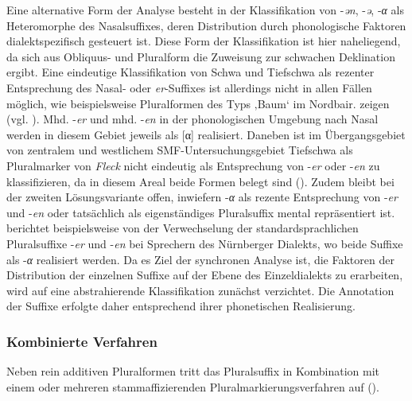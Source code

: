 Eine alternative Form der Analyse besteht in der Klassifikation von -\textit{ən}, -\textit{ə}, \mbox{-\textit{α}} als Heteromorphe des Nasalsuffixes, deren Distribution durch phonologische Faktoren dialektspezifisch gesteuert ist. Diese Form der Klassifikation ist hier naheliegend, da sich aus Obliquus- und Pluralform die Zuweisung zur schwachen Deklination ergibt. Eine eindeutige Klassifikation von Schwa und Tiefschwa als rezenter Entsprechung des Nasal- oder \textit{er}{}-Suffixes ist allerdings nicht in allen Fällen möglich, wie beispielsweise Pluralformen des Typs  ‚Baum‘ im Nordbair. zeigen (vgl. \citealt[128]{Rowley1997}). Mhd. -\textit{er} und mhd. -\textit{en} in der phonologischen Umgebung nach Nasal werden in diesem Gebiet jeweils als [α] realisiert. Daneben ist im Übergangsgebiet von zentralem und westlichem SMF-Untersuchungsgebiet Tiefschwa als Pluralmarker von \textit{Fleck} nicht eindeutig als Entsprechung von -\textit{er} oder -\textit{en} zu klassifizieren, da in diesem Areal beide Formen belegt sind (\citealt[29--30]{SMF7}). Zudem bleibt bei der zweiten Lösungsvariante offen, inwiefern -\textit{α} als rezente Entsprechung von -\textit{er} und -\textit{en} oder tatsächlich als eigenständiges Pluralsuffix mental repräsentiert ist. \citet[129]{Kalau1984} berichtet beispielsweise von der Verwechselung der standardsprachlichen Pluralsuffixe -\textit{er} und -\textit{en} bei Sprechern des Nürnberger Dialekts, wo beide Suffixe als -\textit{α} realisiert werden. Da es Ziel der synchronen Analyse ist, die Faktoren der Distribution der einzelnen Suffixe auf der Ebene des Einzeldialekts zu erarbeiten, wird auf eine abstrahierende Klassifikation zunächst verzichtet. Die Annotation der Suffixe erfolgte daher entsprechend ihrer phonetischen Realisierung.

\subsubsection{Kombinierte Verfahren}
\label{sec:7.1.1.2}
Neben rein additiven Pluralformen tritt das Pluralsuffix in Kombination mit einem oder mehreren stammaffizierenden Pluralmarkierungsverfahren auf ().


